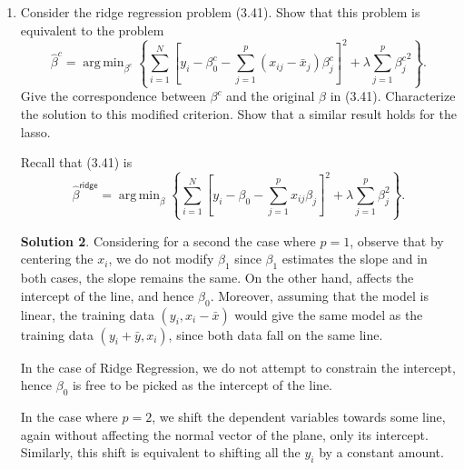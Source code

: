 \documentclass[]{book}
\theoremstyle{definition}
\newtheorem*{soln}{Solution}
\newcommand{\DD}{\mathbf{D}}
\newcommand{\ZZ}{\mathbf{Z}}
\newcommand{\RR}{\mathbf{R}}
\newcommand{\QQ}{\mathbf{Q}}
\newcommand{\yy}{\mathbf{y}}
\newcommand{\ridge}{\textsf{ridge}}
\DeclareMathOperator*{\argmin}{arg\,min} \DeclareMathOperator*{\Cov}{Cov}
\begin{document}
\begin{enumerate}
\begin{soln}
		In other words, $\hat\beta=(\DD\RR)^{-1}\ZZ^T\yy$ and
		\begin{equation}
			\begin{split}
				\hat\beta &= (\DD\RR)^{-1}\ZZ^T\yy \\
				&= \RR^{-1}\DD^{-1}\ZZ^T\yy \\
				&= \RR^{-1}\QQ^T\yy
			\end{split}
		\end{equation}
	\end{soln}

	\item\label{ex:3.5} Consider the ridge regression problem (3.41). Show that 
	this problem is equivalent to the problem
	\begin{equation}
		\hat\beta^c = \argmin_{\beta^c}\left\{\sum_{i=1}^N\left[y_i-\beta_0^c-\sum_{j=1}^p(x_{ij}-\bar{x}_j)\beta_j^c\right]^2 + \lambda\sum_{j=1}^p{\beta_j^c}^2\right\}.
		\tag{3.85}
	\end{equation}
	Give the correspondence between $\beta^c$ and the original $\beta$ in (3.41).
	Characterize the solution to this modified criterion. Show that a similar
	result holds for the lasso.

	Recall that (3.41) is
	\begin{equation}
		\hat\beta^\ridge = \argmin_{\beta}\left\{\sum_{i=1}^N\left[y_i-\beta_0-\sum_{j=1}^px_{ij}\beta_j\right]^2 + \lambda\sum_{j=1}^p\beta_j^2\right\}.
		\tag{3.41}
	\end{equation}

	\begin{soln}
		Considering for a second the case where $p=1$, observe that by 
		centering the $x_i$, we do not modify $\beta_1$ since $\beta_1$
		estimates the slope and in both cases, the slope remains the same.
		On the other hand, affects the intercept of the line, and hence 
		$\beta_0$. Moreover, assuming that the model is linear,
		the training data $(y_i,x_i-\bar x)$ would give the same model as 
		the training data $(y_i+\bar y,x_i)$, since both data fall on the 
		same line.

		In the case of Ridge Regression, we do not attempt to constrain the
		intercept, hence $\beta_0$ is free to be picked as the intercept of 
		the line.

		In the case where $p=2$, we shift the dependent variables towards some 
		line, again without affecting the normal vector of the plane, only its
		intercept. Similarly, this shift is equivalent to shifting all the
		$y_i$ by a constant amount.


\end{soln}
\end{enumerate}
\end{document}
